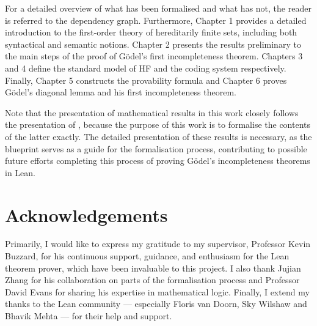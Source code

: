 For a detailed overview of what has been formalised and what has not, 
the reader is referred to the dependency graph.
Furthermore, 
Chapter 1 provides a detailed introduction to the first-order theory of hereditarily finite sets,
including both syntactical and semantic notions.
Chapter 2 presents the results preliminary to the main steps of the proof of Gödel's first
incompleteness theorem.
Chapters 3 and 4 define the standard model of HF and the coding system respectively.
Finally, Chapter 5 constructs the provability formula and Chapter 6
proves Gödel's diagonal lemma and his first incompleteness theorem.

Note that the presentation of mathematical results in this work closely follows the presentation of  
\cite{swierczkowski2003finite}, because the purpose of this work is to formalise 
the contents of the latter exactly.
The detailed presentation of these results is necessary, 
as the blueprint serves as a guide for the formalisation process, 
contributing to possible future efforts completing this process of proving
Gödel's incompleteness theorems in Lean.

\section*{Acknowledgements}

Primarily, I would like to express my gratitude to my supervisor, Professor Kevin Buzzard, 
for his continuous support, guidance, and enthusiasm for the Lean theorem prover, 
which have been invaluable to this project.
I also thank Jujian Zhang for his collaboration on parts of the formalisation process and 
Professor David Evans for sharing his expertise in mathematical logic. 
Finally, I extend my thanks to the Lean community — especially Floris van Doorn, Sky Wilshaw and 
Bhavik Mehta — for their help and support.


